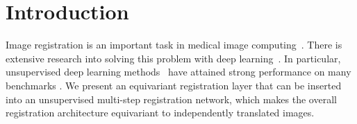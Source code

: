 \section{Introduction}

Image registration is an important task in medical image computing~\cite{roleofreg}. There is extensive research into solving this problem with deep learning~\cite{yang2017quicksilver, balakrishnan2019voxelmorph, mok2020large, tian2022}. In particular, unsupervised deep learning methods~\cite{greer2023inverse, Wang2023ARA} have attained strong performance on many benchmarks \cite{hering2022learn2reg}.
We present an equivariant registration layer that can be inserted into an  unsupervised multi-step registration network, which makes the overall registration architecture equivariant to independently translated images.

